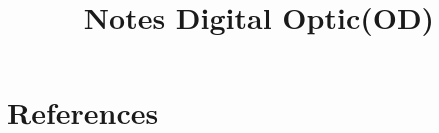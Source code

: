 \documentclass{book}
\newcommand\Course{Digital Optic}
\newcommand\CourseShortName{OD}
\begin{document}
\title{Notes \Course (\CourseShortName)}

\maketitle


\dominitoc %
\tableofcontents


\minitoc




\chapter*{References}
\end{document}
